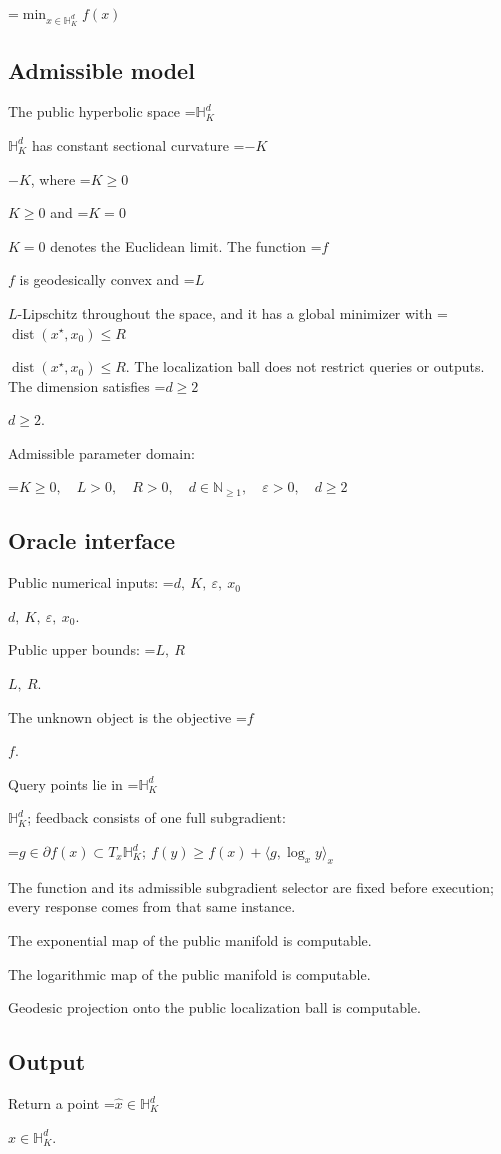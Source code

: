 \documentclass[10pt,a4paper]{article}
\newcommand{\AtlasMath}[1]{\par\begingroup\centering\setbox0=\hbox{$\displaystyle #1$}\ifdim\wd0>1.4\linewidth\typeout{ATLAS WIDE FORMULA: \the\wd0}\fi\ifdim\wd0>\linewidth\resizebox{\linewidth}{!}{\box0}\else\box0\fi\par\endgroup}
\newcommand{\AtlasInlineMath}[1]{\begingroup\setbox0=\hbox{$#1$}\ifdim\wd0>.4\linewidth\endgroup\AtlasMath{#1}\else\endgroup$#1$\fi}
\begin{document}
\AtlasMath{\min_{x\in\mathbb{H}_K^d}f(x)}


\subsection{Admissible model}
The public hyperbolic space \AtlasInlineMath{\mathbb H_K^d} has constant sectional curvature \AtlasInlineMath{-K}, where \AtlasInlineMath{K\ge0} and \AtlasInlineMath{K=0} denotes the Euclidean limit. The function \AtlasInlineMath{f} is geodesically convex and \AtlasInlineMath{L}-Lipschitz throughout the space, and it has a global minimizer with \AtlasInlineMath{\operatorname{dist}(x^\star,x_0)\le R}. The localization ball does not restrict queries or outputs. The dimension satisfies \AtlasInlineMath{d\ge2}.

Admissible parameter domain:


\AtlasMath{K\ge0,\quad L>0,\quad R>0,\quad d\in\mathbb{N}_{\ge1},\quad \varepsilon>0,\quad d\ge2}


\subsection{Oracle interface}
Public numerical inputs: \AtlasInlineMath{d,\ K,\ \varepsilon,\ x_0}.

Public upper bounds: \AtlasInlineMath{L,\ R}.

The unknown object is the objective \AtlasInlineMath{f}.

Query points lie in \AtlasInlineMath{\mathbb{H}_K^d}; feedback consists of one full subgradient:


\AtlasMath{g\in\partial f(x)\subset T_x\mathbb{H}_K^d;\ f(y)\ge f(x)+\langle g,\log_x y\rangle_x}


The function and its admissible subgradient selector are fixed before execution; every response comes from that same instance.

The exponential map of the public manifold is computable.

The logarithmic map of the public manifold is computable.

Geodesic projection onto the public localization ball is computable.

\subsection{Output}
Return a point \AtlasInlineMath{\widehat x\in\mathbb H_K^d}.
\end{document}
